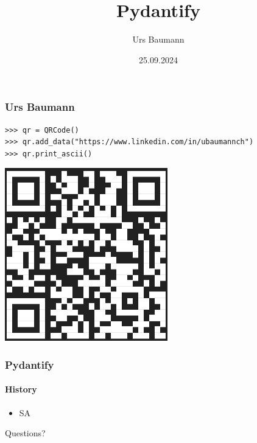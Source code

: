 \documentclass[aspectratio=169]{beamer}
\title{Pydantify}
\author{Urs Baumann}
\date{25.09.2024}
\begin{document}
{
\frame{\titlepage}
}


\begin{frame}[fragile]
  \frametitle{Urs Baumann}

  \begin{verbatim}
>>> qr = QRCode()
>>> qr.add_data("https://www.linkedin.com/in/ubaumannch")
>>> qr.print_ascii()
  \end{verbatim}

  \includegraphics[height = 0.6\textheight]{images/qrcode.png}

\end{frame}


\begin{frame}
  \frametitle{Pydantify}
  \framesubtitle{History}
  \begin{itemize}
    \setlength\itemsep{1em}
    \item SA
  \end{itemize}
\end{frame}


{
\begin{frame}[plain,c]
  \begin{center}
    \Huge \color[rgb]{1,1,1}Questions?
  \end{center}
\end{frame}
}
\end{document}

